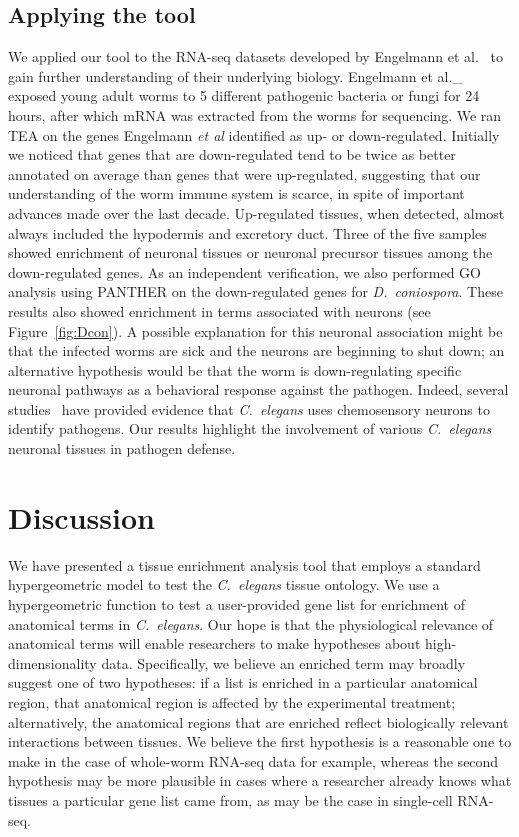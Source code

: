\subsection*{Applying the tool}
We applied our tool to the RNA-seq datasets developed by Engelmann et
al.~\citep{Engelmann2011} to gain further understanding of their underlying
biology. Engelmann et al.\_ exposed young adult worms to 5 different pathogenic
bacteria or fungi for 24 hours, after which mRNA was extracted from the worms
for sequencing. We ran TEA on the genes Engelmann \emph{et al} identified as
up- or down-regulated. Initially we noticed that genes that are down-regulated
tend to be twice as better annotated on average than genes that were up-regulated,
suggesting that our understanding of the worm immune system is scarce, in spite
of important advances made over the last decade. Up-regulated tissues, when
detected, almost always included the hypodermis and excretory duct. Three of the
five samples showed enrichment of neuronal tissues or neuronal precursor tissues
among the down-regulated genes. As an independent verification, we also
performed GO analysis using PANTHER on the down-regulated genes for
\emph{D.~coniospora}. These results also showed enrichment in terms associated
with neurons (see Figure~\ref{fig:Dcon}). A possible explanation for this
neuronal association might be that the infected worms are sick and the neurons
are beginning to shut down; an alternative hypothesis would be that the worm is
down-regulating specific neuronal pathways as a behavioral response against the
pathogen. Indeed, several studies~\citep{Meisel2014, Zhang2005} have provided
evidence that \emph{C.~elegans} uses chemosensory neurons to identify pathogens.
Our results highlight the involvement of various \emph{C.~elegans} neuronal
tissues in pathogen defense.

\section*{Discussion}
We have presented a tissue enrichment analysis tool that employs a standard
hypergeometric model to test the \emph{C.~elegans} tissue ontology. We use a
hypergeometric function to test a user-provided gene list for enrichment of
anatomical terms in \emph{C.~elegans}. Our hope is that the physiological
relevance of anatomical terms will enable researchers to make hypotheses about
high-dimensionality data. Specifically, we believe an enriched term may broadly
suggest one of two hypotheses: if a list is enriched in a particular anatomical
region, that anatomical region is affected by the experimental treatment;
alternatively, the anatomical regions that are enriched reflect biologically
relevant interactions between tissues. We believe the first hypothesis is a
reasonable one to make in the case of whole-worm RNA-seq data for example,
whereas the second hypothesis may be more plausible in cases where a researcher
already knows what tissues a particular gene list came from, as may be the case
in single-cell RNA-seq.

